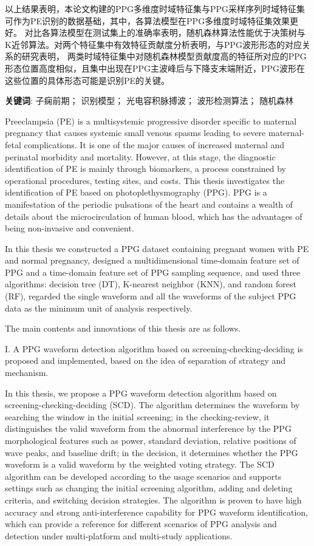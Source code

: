 以上结果表明，本论文构建的PPG多维度时域特征集与PPG采样序列时域特征集可作为PE识别的数据基础，其中，各算法模型在PPG多维度时域特征集效果更好。
对比各算法模型在测试集上的准确率表明，随机森林算法性能优于决策树与K近邻算法。对两个特征集中有效特征贡献度分析表明，与PPG波形形态的对应关系的研究表明，
两类时域特征集中对随机森林模型贡献度高的特征所对应的PPG形态位置高度相似，且集中出现在PPG主波峰后与下降支末端附近，PPG波形在这些位置的具体形态可能是识别PE的关键。

\vspace{2em}

\textbf{关键词}: 子痫前期； 识别模型； 光电容积脉搏波； 波形检测算法； 随机森林


\cleardoublepage
{}

Preeclampsia (PE) is a multisystemic progressive disorder specific to maternal pregnancy that causes systemic small venous spasms 
leading to severe maternal-fetal complications. It is one of the major causes of increased maternal and perinatal morbidity and mortality.  
However, at this stage, the diagnostic identification of PE is mainly through biomarkers, a process constrained by operational procedures, 
testing sites, and costs. 
This thesis investigates the identification of PE based on photoplethysmography (PPG). PPG is a manifestation of the periodic pulsations 
of the heart and contains a wealth of details about the microcirculation of human blood, which has the advantages of being non-invasive and convenient.

In this thesis we constructed a PPG dataset containing pregnant women with PE and normal pregnancy, designed a multidimensional time-domain feature set of PPG and 
a time-domain feature set of PPG sampling sequence, and used three algorithms: decision tree (DT), K-nearest neighbor (KNN), and random forest (RF), 
regarded the single waveform and all the waveforms of the subject PPG data as the minimum unit of analysis respectively.

The main contents and innovations of this thesis are as follows.

I. A PPG waveform detection algorithm based on screening-checking-deciding is proposed and implemented, based on the idea of separation of strategy and mechanism.

In this thesis, we propose a PPG waveform detection algorithm based on screening-checking-deciding (SCD). The algorithm determines the waveform by searching the window 
in the initial screening; in the checking-review, it distinguishes the valid waveform from the abnormal interference by the PPG morphological features such as power, standard deviation, 
relative positions of wave peaks, and baseline drift; in the decision, it determines whether the PPG waveform is a valid waveform by the weighted voting strategy. 
The SCD algorithm can be developed according to the usage scenarios and supports settings such as changing the initial screening algorithm, adding and deleting criteria, 
and switching decision strategies. The algorithm is proven to have high accuracy and strong anti-interference capability for PPG waveform identification, 
which can provide a reference for different scenarios of PPG analysis and detection under multi-platform and multi-study applications.

